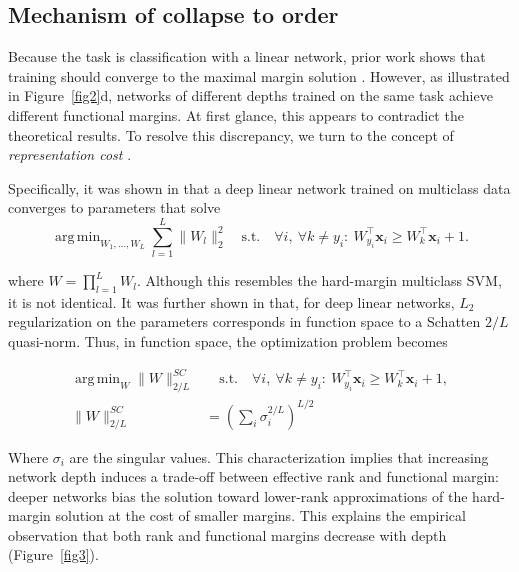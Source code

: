 \documentclass{article}
\DeclareMathOperator*{\argmin}{arg\,min}
\begin{document}
\subsection{Mechanism of collapse to order}

Because the task is classification with a linear network, prior work shows that training should converge to the maximal margin solution \citep{soudry2018implicit, ji2018gradient, lyu2019gradient}. However, as illustrated in Figure~\ref{fig2}d, networks of different depths trained on the same task achieve different functional margins. At first glance, this appears to contradict the theoretical results. To resolve this discrepancy, we turn to the concept of \emph{representation cost} \citep{dai2021representation}.

Specifically, it was shown in \cite{lyu2019gradient} that a deep linear network trained on multiclass data converges to parameters that solve
\[
\argmin_{W_1,\dots,W_L} \sum_{l=1}^L \|W_l\|_2^2
\quad \text{s.t.} \quad
\forall i,\ \forall k \neq y_i:\ 
W_{y_i}^\top \mathbf{x}_i \geq W_k^\top \mathbf{x}_i + 1.
\]

where $W = \prod_{l=1}^L W_l$. Although this resembles the hard-margin multiclass SVM, it is not identical. It was further shown in \cite{dai2021representation} that, for deep linear networks, $L_2$ regularization on the parameters corresponds in function space to a Schatten $2/L$ quasi-norm. Thus, in function space, the optimization problem becomes

\[
\begin{aligned}
\argmin_{W} \|W\|^{SC}_{2/L}
&\quad \text{s.t.} \quad 
\forall i,\ \forall k \neq y_i :\ 
W_{y_i}^\top \mathbf{x}_i \geq W_k^\top \mathbf{x}_i + 1, \\
\|W\|^{SC}_{2/L} 
&= \left(\sum_i \sigma_i^{2/L}\right)^{L/2}
\end{aligned}
\]

Where $\sigma_i$ are the singular values. This characterization implies that increasing network depth induces a trade-off between effective rank and functional margin: deeper networks bias the solution toward lower-rank approximations of the hard-margin solution at the cost of smaller margins. This explains the empirical observation that both rank and functional margins decrease with depth (Figure~\ref{fig3}).
\end{document}
